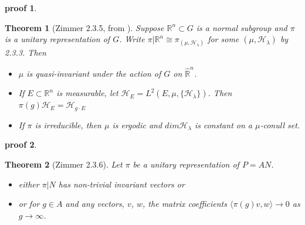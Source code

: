 \documentclass[
  12pt
]{article}
\theoremstyle{break}
\newtheorem{thm}{Theorem}
\theoremstyle{plain}
\newtheorem*{pf}{proof}
\newcommand{\mpi}{\ensuremath{\pi}\xspace}
\begin{document}
  \begin{pf}
    \label{pf:2.3.4}
  \end{pf}

  \begin{thm}[Zimmer 2.3.5, from  \cite{mackey76}]
    \label{thm:2.3.5}
    Suppose $\mathbb{R}^n \subset G$ is a normal subgroup and $\pi$ is a unitary representation of $G$.
    Write $\pi | \mathbb{R}^n \cong \pi_{(\mu, \mathscr{H}_{\lambda})}$ for some
    $(\mu, \mathscr{H}_{\lambda})$ by 2.3.3. Then  
    \begin{itemize}
      \item $\mu$ is quasi-invariant under the action of $G$ on $\hat{\mathbb{R}}^n$. 
      \item If $E \subset \mathbb{R}^n$ is measurable, let
        $\mathscr{H}_E = L^2(E, \mu, \{\mathscr{H}_{\lambda}\})$.
        Then $\pi(g)\mathscr{H}_E = \mathscr{H}_{g \cdot E}$
      \item If $\pi$ is irreducible, then $\mu$ is ergodic and $dim\mathscr{H}_{\lambda}$ is
        constant on a $\mu$-conull set.
    \end{itemize}
  \end{thm}

  \begin{pf}
  \end{pf}

  \begin{thm}[Zimmer 2.3.6]
    \label{thm:2.3.6}
    Let \mpi be  a unitary representation of $P = AN$.
    \begin{itemize}
      \item either $\pi|N$ has non-trivial invariant vectors or
      \item or for $g \in A$ and any vectors, $v$, $w$, the matrix coefficients
        $\langle \pi(g)v, w \rangle \rightarrow 0$ as $g \rightarrow \infty$.
    \end{itemize}
  \end{thm}
\end{document}
